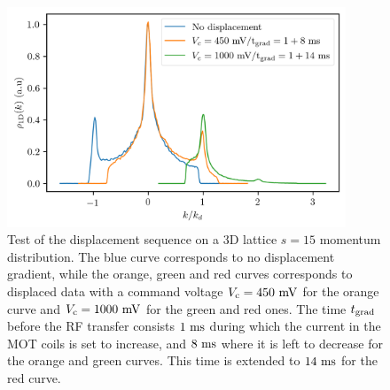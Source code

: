 \begin{figure}
    \centering
    \includegraphics[width=0.9\textwidth]{Fig/Chapter5/overlap.png}
    \caption[Test of the displacement sequence on a 3D lattice $s=15$ momentum distribution]{Test of the displacement sequence on a 3D lattice $s=15$ momentum distribution. The blue curve corresponds to no displacement gradient, while the orange, green and red curves corresponds to displaced data with a command voltage $V_{\rm{c}}=450 \ \rm{mV}$ for the orange curve and $V_{\rm{c}}=1000 \ \rm{mV}$ for the green and red ones. The time $t_{\rm{grad}}$ before the RF transfer consists $1 \ \rm{ms}$ during which the current in the MOT coils is set to increase, and $8 \ \rm{ms}$ where it is left to decrease for the orange and green curves. This time is extended to $14 \ \rm{ms}$ for the red curve.}
    \label{fig:1D_overlap_mott}
\end{figure}


